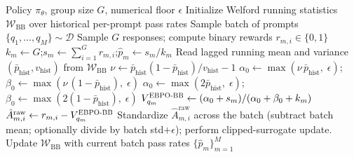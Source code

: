 \documentclass{article}
\theoremstyle{plain}
\theoremstyle{definition}
\theoremstyle{remark}
\newcommand{\oursBB}{\textsc{EBPO-BB}\xspace}
\begin{document}
\begin{algorithm}[tb]
     \caption{EBPO Advantage Estimation (Beta-Binomial Variant)}
     \label{alg:EBPO_BB}
  \begin{algorithmic}[1]
      Policy $\pi_\theta$, group size $G$, numerical floor $\epsilon$
     \STATE Initialize Welford running statistics $\mathcal{W}_{\mathrm{BB}}$ over historical per-prompt pass rates
         \STATE Sample batch of prompts $\{q_1,\dots,q_M\}\sim\mathcal{D}$
             \STATE Sample $G$ responses; compute binary rewards $r_{m,i}\in\{0,1\}$
             \STATE $k_m \gets G$;\quad $s_m \gets \sum_{i=1}^{G} r_{m,i}$;\quad $\hat p_m \gets s_m / k_m$
         \ENDFOR
         \STATE {}
         \STATE Read lagged running mean and variance $(\bar p_{\mathrm{hist}}, v_{\mathrm{hist}})$ from $\mathcal{W}_{\mathrm{BB}}$
             \STATE $\nu \gets \bar p_{\mathrm{hist}}(1-\bar p_{\mathrm{hist}})/v_{\mathrm{hist}} - 1$
             \STATE $\alpha_0 \gets \max(\nu\, \bar p_{\mathrm{hist}},\;\epsilon)$;\quad $\beta_0 \gets \max(\nu\,(1-\bar p_{\mathrm{hist}}),\;\epsilon)$
         \ELSE
             \STATE {}
             \STATE $\alpha_0 \gets \max(2\bar p_{\mathrm{hist}},\;\epsilon)$;\quad $\beta_0 \gets \max(2(1-\bar p_{\mathrm{hist}}),\;\epsilon)$
         \ENDIF
             \STATE $V_{q_m}^{\oursBB} \gets (\alpha_0 + s_m) / (\alpha_0 + \beta_0 + k_m)$ 
                 \STATE $\hat{A}_{m,i}^{\text{raw}} \gets r_{m,i} - V_{q_m}^{\oursBB}$
             \ENDFOR
         \ENDFOR
         \STATE Standardize $\hat{A}_{m,i}^{\text{raw}}$ across the batch (subtract batch mean; optionally divide by batch std$+\epsilon$); perform clipped-surrogate update.
         \STATE Update $\mathcal{W}_{\mathrm{BB}}$ with current batch pass rates $\{\hat p_m\}_{m=1}^{M}$
     \ENDFOR
  \end{algorithmic}
  \end{algorithm}
\fi
\end{document}
